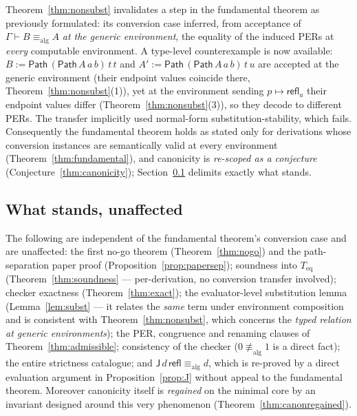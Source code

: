 \documentclass{lmcs}
\newcommand{\refl}{\mathsf{refl}}
\newcommand{\J}{\mathsf{J}}
\newcommand{\aconv}{\equiv_{\mathrm{alg}}}
\newcommand{\Path}{\mathsf{Path}}
\begin{document}
\begin{rem}\label{rem:conversiongap}
  Theorem~\ref{thm:nonsubst} invalidates a step in the fundamental
  theorem as previously formulated: its conversion case inferred,
  from acceptance of $\Gamma \vdash B \aconv A$ \emph{at the generic
  environment}, the equality of the induced PERs at \emph{every}
  computable environment.  A type-level counterexample is now
  available: $B := \Path\,(\Path\,A\,a\,b)\,t\,t$ and
  $A' := \Path\,(\Path\,A\,a\,b)\,t\,u$ are accepted at the generic
  environment (their endpoint values coincide there,
  Theorem~\ref{thm:nonsubst}(1)), yet at the environment sending
  $p \mapsto \refl_a$ their endpoint values differ
  (Theorem~\ref{thm:nonsubst}(3)), so they decode to different PERs.
  The transfer implicitly used normal-form substitution-stability,
  which fails.  Consequently the fundamental theorem holds as stated
  only for derivations whose conversion instances are semantically
  valid at every environment
  (Theorem~\ref{thm:fundamental}), and canonicity is
  \emph{re-scoped as a conjecture}
  (Conjecture~\ref{thm:canonicity}); Section~\ref{sec:whatstands}
  delimits exactly what stands.
\end{rem}

\subsection{What stands, unaffected}
\label{sec:whatstands}

The following are independent of the fundamental theorem's
conversion case and are unaffected: the first no-go theorem
(Theorem~\ref{thm:nogo}) and the path-separation paper proof
(Proposition~\ref{prop:papersep}); soundness into $T_{\mathrm{eq}}$
(Theorem~\ref{thm:soundness} --- per-derivation, no conversion
transfer involved); checker exactness (Theorem~\ref{thm:exact}); the
evaluator-level substitution lemma (Lemma~\ref{lem:subst} --- it
relates the \emph{same} term under environment composition and is
consistent with Theorem~\ref{thm:nonsubst}, which concerns the
\emph{typed relation at generic environments}); the PER, congruence
and renaming clauses of Theorem~\ref{thm:admissible}; consistency of
the checker ($0 \not\aconv 1$ is a direct fact); the entire
strictness catalogue; and $\J\,d\,\refl \aconv d$, which is
re-proved by a direct evaluation argument in
Proposition~\ref{prop:J} without appeal to the fundamental theorem.
Moreover canonicity itself is \emph{regained} on the minimal core by
an invariant designed around this very phenomenon
(Theorem~\ref{thm:canonregained}).
\end{document}
